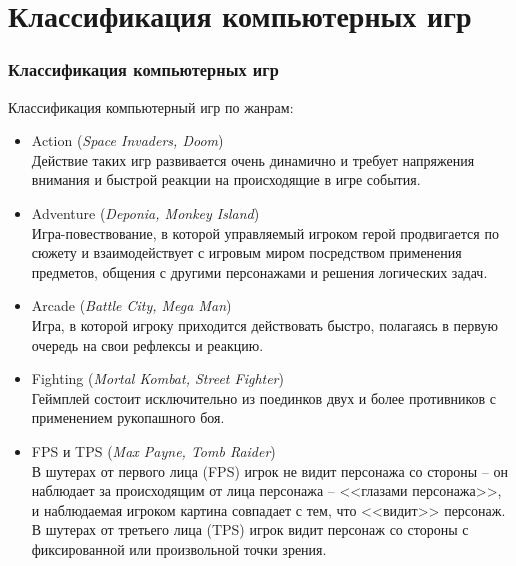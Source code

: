 \section{Классификация компьютерных игр}
\begin{frame}
    \frametitle{Классификация компьютерных игр}
    Классификация компьютерный игр по жанрам:
    \begin{itemize}
        \item Action (\emph{Space Invaders, Doom})\\
            \tiny Действие таких игр развивается очень динамично и требует напряжения внимания и 
            быстрой реакции на происходящие в игре события.
        \item \normalsize Adventure (\emph{Deponia, Monkey Island})\\
            \tiny Игра-повествование, в которой управляемый игроком герой продвигается по сюжету 
            и взаимодействует с игровым миром посредством применения предметов, общения с другими 
            персонажами и решения логических задач.
        \item \normalsize Arcade (\emph{Battle City, Mega Man})\\
            \tiny Игра, в которой игроку приходится действовать быстро, полагаясь в первую очередь 
            на свои рефлексы и реакцию.
        \item \normalsize Fighting (\emph{Mortal Kombat, Street Fighter})\\
            \tiny Геймплей состоит исключительно из поединков двух и более противников с применением 
            рукопашного боя.
        \item \normalsize FPS и TPS (\emph{Max Payne, Tomb Raider})\\
            \tiny В шутерах от первого лица (FPS) игрок не видит персонажа со стороны -- он наблюдает 
            за происходящим от лица персонажа -- <<глазами персонажа>>, и наблюдаемая игроком картина 
            совпадает с тем, что <<видит>> персонаж. В шутерах от третьего лица (TPS) игрок видит 
            персонаж со стороны с фиксированной или произвольной точки зрения.
    \end{itemize}
\end{frame}

